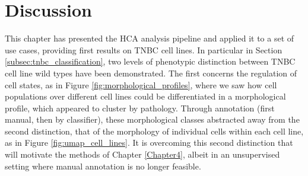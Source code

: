 \section{Discussion}

This chapter has presented the HCA analysis pipeline and applied it to a set of use cases, providing first results on TNBC cell lines. In particular in Section \ref{subsec:tnbc_classification}, two levels of phenotypic distinction between TNBC cell line wild types have been demonstrated. The first concerns the regulation of cell states, as in Figure \ref{fig:morphological_profiles}, where we saw how cell populations over different cell lines could be differentiated in a morphological profile, which appeared to cluster by pathology. Through annotation (first manual, then by classifier), these morphological classes abstracted away from the second distinction, that of the morphology of individual cells within each cell line, as in Figure \ref{fig:umap_cell_lines}. It is overcoming this second distinction that will motivate the methods of Chapter \ref{Chapter4}, albeit in an unsupervised setting where manual annotation is no longer feasible.

%
%
%
%
%
%
%



